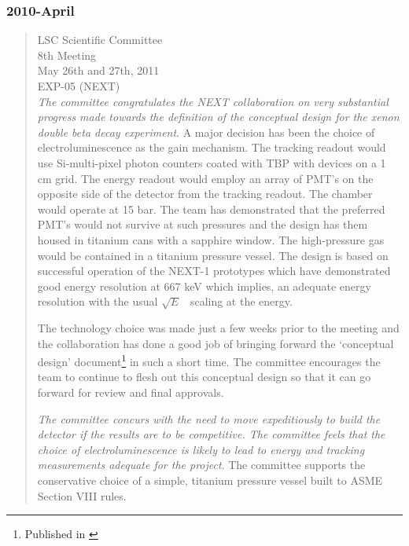 \subsubsection*{2010-April}
\begin{quotation}
LSC Scientific Committee \\
8th Meeting \\
May 26th and 27th, 2011 \\
EXP-05 (NEXT)\\

{\em The committee congratulates the NEXT collaboration on very substantial progress made towards the definition of the conceptual design for the xenon double beta decay experiment}. A major decision has been the choice of electroluminescence as the gain mechanism. The tracking readout would use Si-multi-pixel photon counters coated with TBP with devices on a 1 cm grid. The energy readout would employ an array of PMT’s on the opposite side of the detector from the tracking readout. The chamber would operate at 15 bar. The team has demonstrated that the preferred PMT’s would not survive at such pressures and the design has them housed in titanium cans with a sapphire window. The high-pressure gas would be contained in a titanium pressure vessel. The design is based on successful operation of the NEXT-1 prototypes which have demonstrated good energy resolution at 667 keV which implies, an adequate energy resolution with the usual $\sqrt{E}$~ scaling at the \Qbb energy.
 
The technology choice was made just a few weeks prior to the meeting and the collaboration has done a good job of bringing forward the ‘conceptual design’ document\footnote{Published in \cite{Alvarez:2011my}} in such a short time. The committee encourages the team to continue to flesh out this conceptual design so that it can go forward for review and final approvals. 
 
{\em The committee concurs with the need to move expeditiously to build the detector if the results are to be competitive. The committee feels that the choice of electroluminescence is likely to lead to energy and tracking measurements adequate for the project}. The committee supports the conservative choice of a simple, titanium pressure vessel built to ASME Section VIII rules.
 

\end{quotation}
